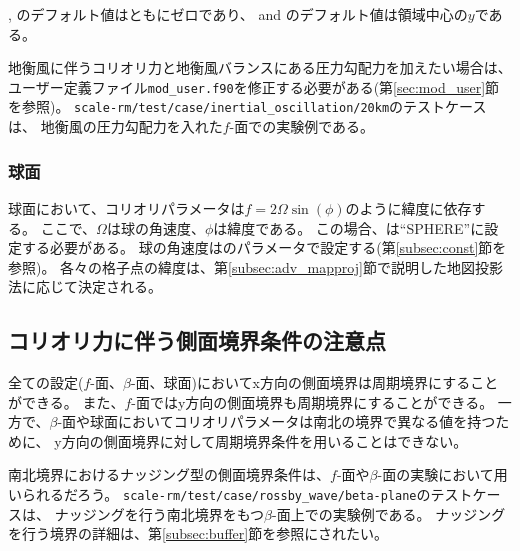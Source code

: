 , のデフォルト値はともにゼロであり、
and のデフォルト値は領域中心の$y$である。

地衡風に伴うコリオリ力と地衡風バランスにある圧力勾配力を加えたい場合は、
ユーザー定義ファイル\verb|mod_user.f90|を修正する必要がある(第\ref{sec:mod_user}節を参照)。
\verb|scale-rm/test/case/inertial_oscillation/20km|のテストケースは、
地衡風の圧力勾配力を入れた$f$-面での実験例である。

\subsubsection{球面}
球面において、コリオリパラメータは$f = 2\Omega \sin(\phi)$のように緯度に依存する。
ここで、$\Omega$は球の角速度、$\phi$は緯度である。
この場合、は``SPHERE''に設定する必要がある。
球の角速度はのパラメータで設定する(第\ref{subsec:const}節を参照)。
各々の格子点の緯度は、第\ref{subsec:adv_mapproj}節で説明した地図投影法に応じて決定される。


\subsection{コリオリ力に伴う側面境界条件の注意点}

全ての設定($f$-面、$\beta$-面、球面)においてx方向の側面境界は周期境界にすることができる。
また、$f$-面ではy方向の側面境界も周期境界にすることができる。
一方で、$\beta$-面や球面においてコリオリパラメータは南北の境界で異なる値を持つために、
y方向の側面境界に対して周期境界条件を用いることはできない。

南北境界におけるナッジング型の側面境界条件は、$f$-面や$\beta$-面の実験において用いられるだろう。
\verb|scale-rm/test/case/rossby_wave/beta-plane|のテストケースは、
ナッジングを行う南北境界をもつ$\beta$-面上での実験例である。
ナッジングを行う境界の詳細は、第\ref{subsec:buffer}節を参照にされたい。
